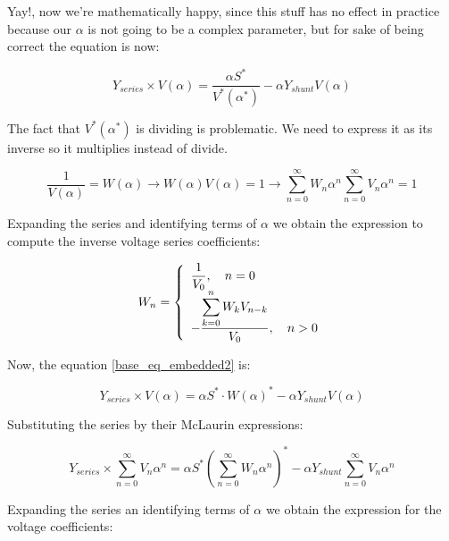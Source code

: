 \documentclass[nols,a4paper,twoside,symmetric,notoc,fleqn]{tufte-book}
\begin{document}
	Yay!, now we're mathematically happy, since this stuff has no effect in practice because our $\alpha$ is not going to be a complex parameter, but for sake of being correct the equation is now:
	
	\begin{equation}
	{{Y}_{series}\times {V}( \alpha )} = \frac{ \alpha{S}^*}{{V}^*( \alpha^* )} - \alpha {Y}_{shunt} {V}( \alpha )
	\label{base_eq_embedded2}
	\end{equation}
	



The fact that ${V}^*( \alpha^* )$ is dividing is problematic. We need to express it as its inverse so it multiplies instead of divide.

\begin{equation} 
\frac{1}{{V}( \alpha)} = {W}( \alpha ) \longrightarrow {W}( \alpha ) {V}( \alpha) = 1 \longrightarrow \sum_{n=0}^{\infty}{{W}_n \alpha^n}  \sum_{n=0}^{\infty}{{V}_n \alpha^n} = 1
\end{equation}

Expanding the series and identifying terms of $\alpha$ we obtain the expression to compute the inverse voltage series coefficients:

\begin{equation}
{W}_n =
\left\{
\begin{array}{ll}
\mathlarger{\frac{1}{{V}_0}}, \quad n=0\\
\mathlarger{-\frac{\mathlarger{\sum_{k=0}^{n}{W}_k {V}_{n-k}}}{{V}_0}}, \quad n>0
\end{array}
\right.
\end{equation}


Now, the equation \ref{base_eq_embedded2} is:

\begin{equation}
{{Y}_{series}\times {V}( \alpha )} = \alpha{S}^* \cdot {W}( \alpha)^*  - \alpha {Y}_{shunt} {V}( \alpha )
\label{base_eq_embedded3}
\end{equation}

Substituting the series by their McLaurin expressions:

\begin{equation}
{{Y}_{series}\times \sum_{n=0}^{\infty}{{V}_n \alpha^n}} = \alpha{S}^* \left(\sum_{n=0}^{\infty}{{W}_n \alpha^n}\right)^*  - \alpha {Y}_{shunt} \sum_{n=0}^{\infty}{{V}_n \alpha^n}
\label{base_eq_embedded4}
\end{equation}

Expanding the series an identifying terms of $\alpha$ we obtain the expression for the voltage coefficients:
\end{document}

